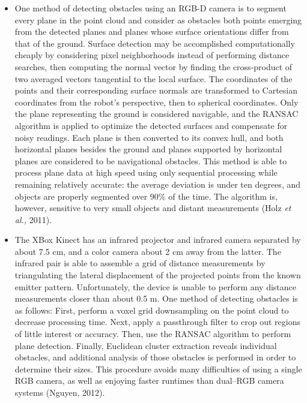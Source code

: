 \documentclass{article}
\begin{document}
\begin{itemize}
\item{One method of detecting obstacles using an RGB-D camera is to segment every plane in the point cloud and consider as obstacles both points emerging from the detected planes and planes whose surface orientations differ from that of the ground.  Surface detection may be accomplished computationally cheaply by considering pixel neighborhoods instead of performing distance searches, then computing the normal vector by finding the cross-product of two averaged vectors tangential to the local surface.  The coordinates of the points and their corresponding surface normals are transformed to Cartesian coordinates from the robot's perspective, then to spherical coordinates.  Only the plane representing the ground is considered navigable, and the RANSAC algorithm is applied to optimize the detected surfaces and compensate for noisy readings.  Each plane is then converted to its convex hull, and both horizontal planes besides the ground and planes supported by horizontal planes are considered to be navigational obstacles.  This method is able to process plane data at high speed using only sequential processing while remaining relatively accurate: the average deviation is under ten degrees, and objects are properly segmented over 90\% of the time.  The algorithm is, however, sensitive to very small objects and distant measurements (Holz \textit{et al.,} 2011).}
\item{The XBox Kinect has an infrared projector and infrared camera separated by about 7.5 cm, and a color camera about 2 cm away from the latter.  The infrared pair is able to assemble a grid of distance measurements by triangulating the lateral displacement of the projected points from the known emitter pattern.  Unfortunately, the device is unable to perform any distance measurements closer than about 0.5 m.  One method of detecting obstacles is as follows:  First, perform a voxel grid downsampling on the point cloud to decrease processing time.  Next, apply a passthrough filter to crop out regions of little interest or accuracy.  Then, use the RANSAC algorithm to perform plane detection.  Finally, Euclidean cluster extraction reveals individual obstacles, and additional analysis of those obstacles is performed in order to determine their sizes.  This procedure avoids many difficulties of using a single RGB camera, as well as enjoying faster runtimes than dual--RGB camera systems (Nguyen, 2012).}
\end{itemize}
\end{document}
